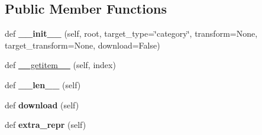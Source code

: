 \subsection*{Public Member Functions}
\begin{DoxyCompactItemize}
\item 
\mbox{\label{classtorchvision_1_1datasets_1_1caltech_1_1Caltech101_a1b2766bcf8e53860b824ab55a1278cf1}} 
def {\bfseries \+\_\+\+\_\+init\+\_\+\+\_\+} (self, root, target\+\_\+type=\char`\"{}category\char`\"{}, transform=None, target\+\_\+transform=None, download=False)
\item 
def \hyperlink{classtorchvision_1_1datasets_1_1caltech_1_1Caltech101_aab20aea2638bfab3ce6b3af9fde34284}{\+\_\+\+\_\+getitem\+\_\+\+\_\+} (self, index)
\item 
\mbox{\label{classtorchvision_1_1datasets_1_1caltech_1_1Caltech101_a15bf3f3995881e7e565931946c8efccb}} 
def {\bfseries \+\_\+\+\_\+len\+\_\+\+\_\+} (self)
\item 
\mbox{\label{classtorchvision_1_1datasets_1_1caltech_1_1Caltech101_a772290375df1e83f66d0131e03df982d}} 
def {\bfseries download} (self)
\item 
\mbox{\label{classtorchvision_1_1datasets_1_1caltech_1_1Caltech101_a9b36236da91f037a7867eca037271569}} 
def {\bfseries extra\+\_\+repr} (self)
\end{DoxyCompactItemize}
